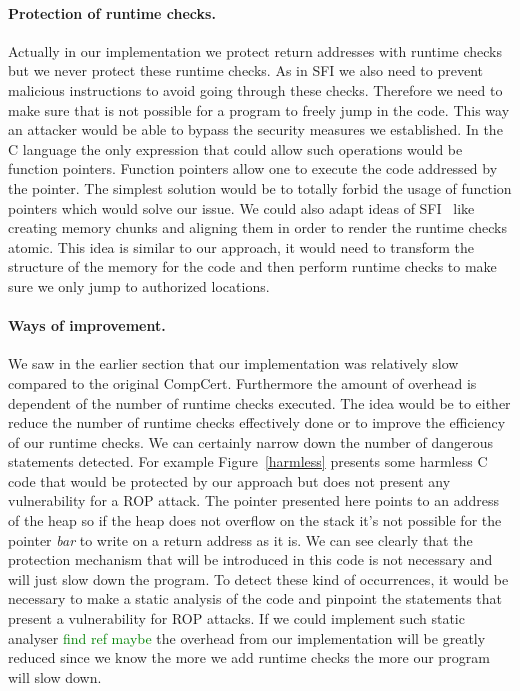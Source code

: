\documentclass[11pt]{sdm}
\begin{document}
\paragraph{Protection of runtime checks.}
\label{par:Protection of runtime checks}
Actually in our implementation we protect return addresses with runtime checks but we never protect these runtime checks. As in SFI we also need to prevent malicious instructions to avoid going through these checks. Therefore we need to make sure that is not possible for a program to freely jump in the code. This way an attacker would be able to bypass the security measures we established.
In the C language the only expression that could allow such operations would be function pointers. Function pointers allow one to execute the code addressed by the pointer.
The simplest solution would be to totally forbid the usage of function pointers which would solve our issue.
We could also adapt ideas of SFI~\cite{Mccamant_evaluatingsfi} like creating memory chunks and aligning them in order to render the runtime checks atomic. This idea is similar to our approach, it would need to transform the structure of the memory for the code and then perform runtime checks to make sure we only jump to authorized locations.

\paragraph{Ways of improvement.}
\label{par:improvement}
We saw in the earlier section that our implementation was relatively slow compared to the original CompCert. Furthermore the amount of overhead is dependent of the number of runtime checks executed.
The idea would be to either reduce the number of runtime checks effectively done or to improve the efficiency of our runtime checks.
We can certainly narrow down the number of dangerous statements detected. For example Figure~\ref{harmless} presents some harmless C code that would be protected by our approach but does not present any vulnerability for a ROP attack. The pointer presented here points to an address of the heap so if the heap does not overflow on the stack it's not possible for the pointer \textit{bar} to write on a return address as it is.
We can see clearly that the protection mechanism that will be introduced in this code is not necessary and will just slow down the program.
To detect these kind of occurrences, it would be necessary to make a static analysis of the code and pinpoint the statements that present a vulnerability for ROP attacks.
If we could implement such static analyser \textcolor{green}{find ref maybe} the overhead from our implementation will be greatly reduced since we know the more we add runtime checks the more our program will slow down.
\end{document}
